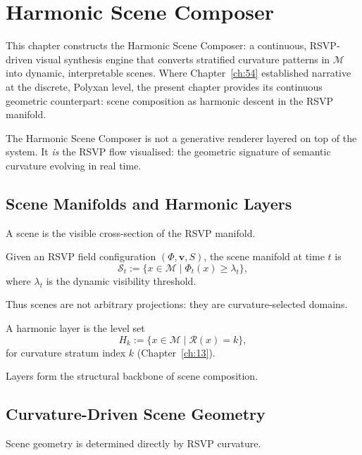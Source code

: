 \chapter{Harmonic Scene Composer}
\label{ch:55}

This chapter constructs the Harmonic Scene Composer: a continuous, RSVP-driven
visual synthesis engine that converts stratified curvature patterns in
$\mathcal{M}$ into dynamic, interpretable scenes.  
Where Chapter~\ref{ch:54} established narrative at the discrete, Polyxan
level, the present chapter provides its continuous geometric counterpart:
scene composition as harmonic descent in the RSVP manifold.

The Harmonic Scene Composer is not a generative renderer layered on top of the
system.  
It \emph{is} the RSVP flow visualised: the geometric signature of semantic
curvature evolving in real time.

\section{Scene Manifolds and Harmonic Layers}
\label{sec:55:scene-manifolds}

A scene is the visible cross-section of the RSVP manifold.

\begin{definition}
Given an RSVP field configuration $(\Phi, \mathbf{v}, S)$, the scene manifold
at time $t$ is
\[
\mathcal{S}_t := \{ x \in \mathcal{M} \mid \Phi_t(x) \ge \lambda_t \},
\]
where $\lambda_t$ is the dynamic visibility threshold.
\end{definition}

Thus scenes are not arbitrary projections: they are curvature-selected domains.

\begin{definition}
A harmonic layer is the level set
\[
H_k := \{ x \in \mathcal{M} \mid \mathcal{R}(x) = k \},
\]
for curvature stratum index $k$ (Chapter~\ref{ch:13}).
\end{definition}

Layers form the structural backbone of scene composition.


\section{Curvature-Driven Scene Geometry}
\label{sec:55:geometry}

Scene geometry is determined directly by RSVP curvature.

